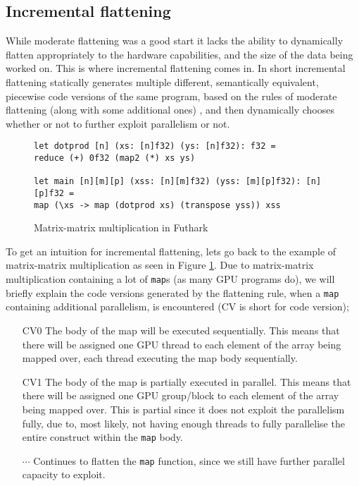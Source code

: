 \subsection{Incremental flattening}
While moderate flattening was a good start it lacks the ability to dynamically
flatten appropriately to the hardware capabilities, and the size of the data
being worked on. This is where incremental flattening comes in. In short
incremental flattening statically generates multiple different, semantically
equivalent, piecewise code versions of the same program, based on the rules of
moderate flattening (along with some additional ones) \cite{inc-flat}, and then
dynamically chooses whether or not to further exploit parallelism or not.
\begin{figure}[h]
\centering
\lstset{language=haskell}
\begin{lstlisting}
let dotprod [n] (xs: [n]f32) (ys: [n]f32): f32 =
reduce (+) 0f32 (map2 (*) xs ys)

let main [n][m][p] (xss: [n][m]f32) (yss: [m][p]f32): [n][p]f32 =
map (\xs -> map (dotprod xs) (transpose yss)) xss
\end{lstlisting}%
\caption{Matrix-matrix multiplication in Futhark \cite{ppopp}}
\label{matmultFuthark}
\end{figure}
To get an intuition for incremental flattening, lets go back to the example of
matrix-matrix multiplication as seen in Figure \ref{matmultFuthark}. Due to
matrix-matrix multiplication containing a lot of \texttt{map}s (as many GPU
programs do), we will briefly explain the code versions generated by the
flattening rule, when a \texttt{map} containing additional parallelism, is
encountered (CV is short for code version);
\begin{itemize}
\item[CV0] The body of the map will be executed sequentially. This means that there will be assigned one GPU thread to each element of the array being mapped over, each thread executing the map body sequentially.
\item[CV1] The body of the map is partially executed in parallel. This means that there will be assigned one GPU group/block to each element of the array being mapped over. This is partial since it does not exploit the parallelism fully, due to, most likely, not having enough threads to fully parallelise the entire construct within the \texttt{map} body.
\item[$\cdots$] Continues to flatten the \texttt{map} function, since we still have further parallel capacity to exploit.  
\end{itemize}
